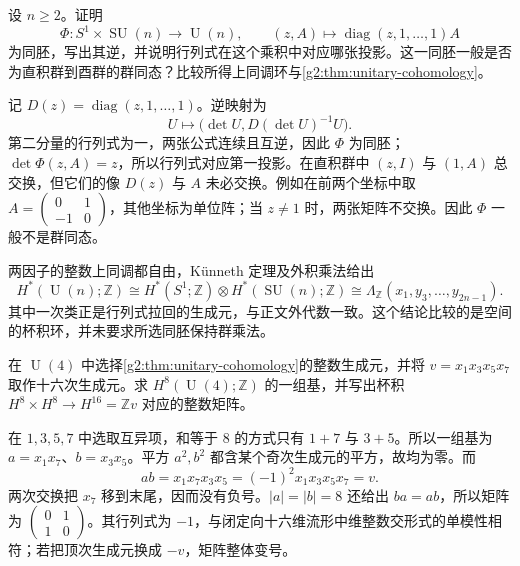 \begin{exercise}\label{g2:ex:unitary-determinant-product}
	设 \(n\ge2\)。证明
	\[
		\Phi:S^1\times\operatorname{SU}(n)\longrightarrow\operatorname{U}(n),\qquad(z,A)\longmapsto\operatorname{diag}(z,1,\ldots,1)A
	\]
	为同胚，写出其逆，并说明行列式在这个乘积中对应哪张投影。这一同胚一般是否为直积群到酉群的群同态？比较所得上同调环与\cref{g2:thm:unitary-cohomology}。
\end{exercise}
\begin{solution}
	记 \(D(z)=\operatorname{diag}(z,1,\ldots,1)\)。逆映射为
	\[
		U\longmapsto\bigl(\det U,D(\det U)^{-1}U\bigr).
	\]
	第二分量的行列式为一，两张公式连续且互逆，因此 \(\Phi\) 为同胚；\(\det\Phi(z,A)=z\)，所以行列式对应第一投影。在直积群中 \((z,I)\) 与 \((1,A)\) 总交换，但它们的像 \(D(z)\) 与 \(A\) 未必交换。例如在前两个坐标中取 \(A=\left(\begin{smallmatrix}0&1\\-1&0\end{smallmatrix}\right)\)，其他坐标为单位阵；当 \(z\ne1\) 时，两张矩阵不交换。因此 \(\Phi\) 一般不是群同态。

	两因子的整数上同调都自由，Künneth 定理及外积乘法给出
	\[
		H^*(\operatorname{U}(n);\mathbb Z)\cong H^*(S^1;\mathbb Z)\otimes H^*(\operatorname{SU}(n);\mathbb Z)
		\cong\Lambda_{\mathbb Z}(x_1,y_3,\ldots,y_{2n-1}).
	\]
	其中一次类正是行列式拉回的生成元，与正文外代数一致。这个结论比较的是空间的杯积环，并未要求所选同胚保持群乘法。
\end{solution}

\begin{exercise}\label{g2:ex:unitary-four-middle-pairing}
	在 \(\operatorname{U}(4)\) 中选择\cref{g2:thm:unitary-cohomology}的整数生成元，并将 \(v=x_1x_3x_5x_7\) 取作十六次生成元。求 \(H^8(\operatorname{U}(4);\mathbb Z)\) 的一组基，并写出杯积 \(H^8\times H^8\rightarrow H^{16}=\mathbb Zv\) 对应的整数矩阵。
\end{exercise}
\begin{solution}
	在 \(1,3,5,7\) 中选取互异项，和等于 \(8\) 的方式只有 \(1+7\) 与 \(3+5\)。所以一组基为 \(a=x_1x_7\)、\(b=x_3x_5\)。平方 \(a^2,b^2\) 都含某个奇次生成元的平方，故均为零。而
	\[
		ab=x_1x_7x_3x_5=(-1)^2x_1x_3x_5x_7=v.
	\]
	两次交换把 \(x_7\) 移到末尾，因而没有负号。\(|a|=|b|=8\) 还给出 \(ba=ab\)，所以矩阵为 \(\left(\begin{smallmatrix}0&1\\1&0\end{smallmatrix}\right)\)。其行列式为 \(-1\)，与闭定向十六维流形中维整数交形式的单模性相符；若把顶次生成元换成 \(-v\)，矩阵整体变号。
\end{solution}


